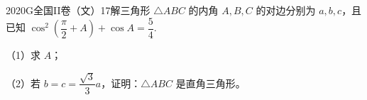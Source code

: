 
\begin{problem}{2020}{G}{全国II卷（文）}{17}{解三角形}
$ \triangle ABC $ 的内角 $ A,B,C $ 的对边分别为 $ a,b,c $，且已知 $ \cos^2\left(\dfrac{\pi}{2}+A\right)+\cos A=\dfrac{5}{4} $.

（1）求 $ A $；

（2）若 $ b=c=\dfrac{\sqrt{3}}{3}a $，证明：$ \triangle ABC $ 是直角三角形。
\end{problem}

\begin{answer}

\end{answer}

\begin{solutions}

\end{solutions}